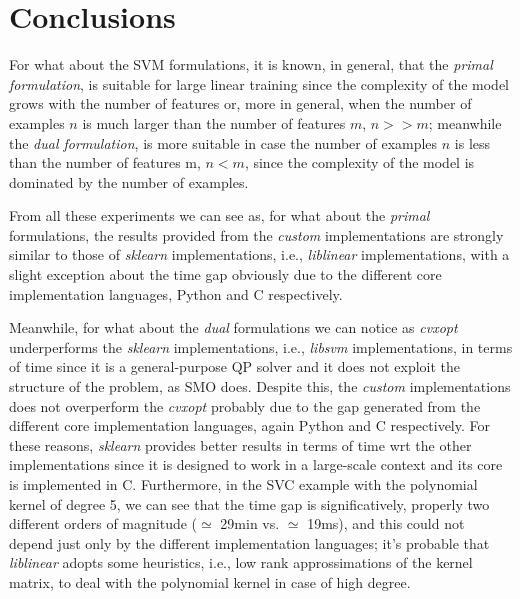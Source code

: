 \section{Conclusions}

For what about the SVM formulations, it is known, in general, that the \emph{primal formulation}, is suitable for large linear training since the complexity of the model grows with the number of features or, more in general, when the number of examples $n$ is much larger than the number of features $m$, $n >> m$; meanwhile the \emph{dual formulation}, is more suitable in case the number of examples $n$ is less than the number of features m, $n < m$, since the complexity of the model is dominated by the number of examples.

From all these experiments we can see as, for what about the \emph{primal} formulations, the results provided from the \emph{custom} implementations are strongly similar to those of \emph{sklearn} implementations, i.e., \emph{liblinear} \cite{fan2008liblinear} implementations, with a slight exception about the time gap obviously due to the different core implementation languages, Python and C respectively.

Meanwhile, for what about the \emph{dual} formulations we can notice as \emph{cvxopt} \cite{vandenberghe2010cvxopt} underperforms the \emph{sklearn} implementations, i.e., \emph{libsvm} \cite{chang2011libsvm} implementations, in terms of time since it is a general-purpose QP solver and it does not exploit the structure of the problem, as SMO does.
Despite this, the \emph{custom} implementations does not overperform the \emph{cvxopt} \cite{vandenberghe2010cvxopt} probably due to the gap generated from the different core implementation languages, again Python and C respectively.
For these reasons, \emph{sklearn} provides better results in terms of time wrt the other implementations since it is designed to work in a large-scale context and its core is implemented in C.
Furthermore, in the SVC example with the polynomial kernel of degree 5, we can see that the time gap is significatively, properly two different orders of magnitude ($\simeq$ 29min vs. $\simeq$ 19ms), and this could not depend just only by the different implementation languages; it's probable that \emph{liblinear} \cite{fan2008liblinear} adopts some heuristics, i.e., low rank approssimations of the kernel matrix, to deal with the polynomial kernel in case of high degree.

